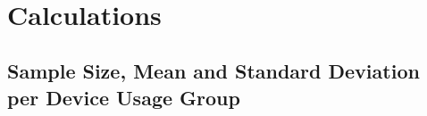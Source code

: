 \documentclass[11pt]{article}
\begin{document}
    \begin{center}
    \end{center}
    { \hspace*{\fill} \\}
    
    \hypertarget{calculations}{%
\section{Calculations}\label{calculations}}

    \hypertarget{sample-size-mean-and-standard-deviation-per-device-usage-group}{%
\subsection{Sample Size, Mean and Standard Deviation per Device Usage
Group}\label{sample-size-mean-and-standard-deviation-per-device-usage-group}}
\end{document}
